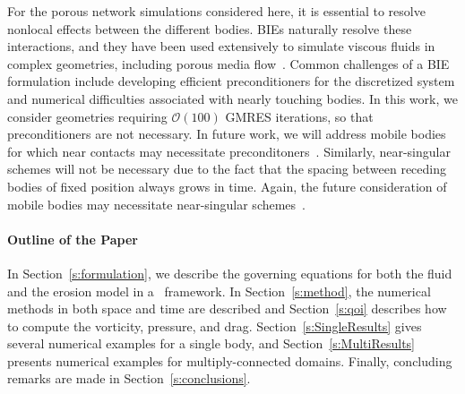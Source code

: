 \documentclass[preprint, 10pt]{elsarticle}
\begin{document}
For the porous network simulations considered here, it is essential to resolve nonlocal effects between the different bodies.  BIEs naturally resolve these interactions, and they have been used extensively to simulate viscous fluids in complex geometries, including porous media flow~\cite{dea-qua-bir-jua2018, bar-mar-vee-zha2018}.  Common challenges of a BIE formulation include developing efficient preconditioners for the discretized system and numerical difficulties associated with nearly touching bodies. In this work, we consider geometries requiring $\mathcal{O}(100)$ GMRES iterations, so that preconditioners are not necessary. In future work, we will address mobile bodies for which near contacts may necessitate preconditoners~\cite{qua-bir2015a, qua-cou-dar2018, cou-pou-dar2017}. Similarly, near-singular schemes will not be necessary due to the fact that the spacing between receding bodies of fixed position always grows in time. Again, the future consideration of mobile bodies may necessitate near-singular schemes~\cite{qua-bir2014a, klo-bar-gre-one2013, bar-wu-vee2015, hel-oja2008a, bea-lai2001}.

\paragraph{Outline of the Paper}
In Section~\ref{s:formulation}, we describe the governing equations for both the fluid and the erosion model in a \thL~framework.  In Section~\ref{s:method}, the numerical methods in both space and time are described and Section~\ref{s:qoi} describes how to compute the vorticity, pressure, and drag.  Section~\ref{s:SingleResults} gives several numerical examples for a single body, and Section~\ref{s:MultiResults} presents numerical examples for multiply-connected domains.  Finally, concluding remarks are made in Section~\ref{s:conclusions}.

\end{document}
